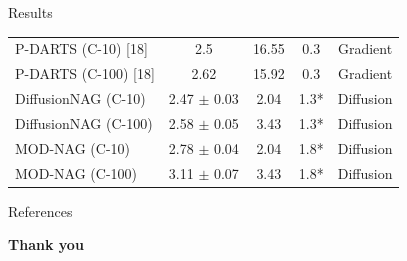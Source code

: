 \documentclass[aspectratio=169,xcolor=dvipsnames]{beamer}
\begin{document}
\begin{frame}{Results}
\begin{table}[h]
\begin{tabular}{lcccc}
            P-DARTS (C-10) {[}18{]}         & 2.5                     & 16.55                & 0.3                             & Gradient               \\
            P-DARTS (C-100) {[}18{]}        & 2.62                    & 15.92                & 0.3                             & Gradient               \\
            DiffusionNAG (C-10)             & 2.47 $\pm$ 0.03         & 2.04                 & 1.3*                            & Diffusion                     \\
            DiffusionNAG (C-100)            & 2.58 $\pm$ 0.05         & 3.43                 & 1.3*                            & Diffusion                     \\
            MOD-NAG (C-10)                  & 2.78 $\pm$ 0.04         & 2.04                 & 1.8*                            & Diffusion                     \\
            MOD-NAG (C-100)                 & 3.11 $\pm$ 0.07         & 3.43                 & 1.8*                            & Diffusion                     \\
        \end{tabular}
    \end{table}
    \nocite{2023arXiv230516943A}
    \nocite{DBLP:journals/corr/abs-1807-11626}
    \nocite{DBLP:journals/corr/abs-1812-00332}
    \nocite{white2023neural}
\end{frame}

\begin{frame}{References}
    \printbibliography[heading=none]
\end{frame}


\begin{frame}
    \Huge{\centerline{\textbf{Thank you}}}
\end{frame}

\end{document}
